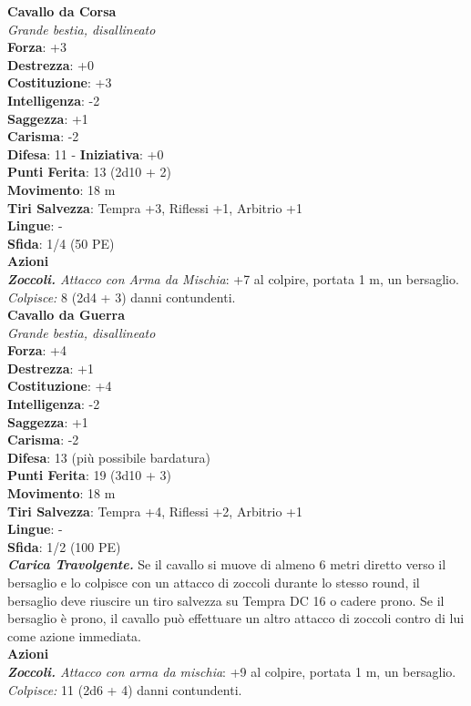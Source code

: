 \begin{multicols}{2}
\medskip\textbf{Cavallo da Corsa}\\
\emph{Grande bestia, disallineato}\\
\textbf{Forza}: +3\\
\textbf{Destrezza}: +0\\
\textbf{Costituzione}: +3\\
\textbf{Intelligenza}: -2\\
\textbf{Saggezza}: +1\\
\textbf{Carisma}: -2\\
\textbf{Difesa}: 11 - \textbf{Iniziativa}: +0\\
\textbf{Punti Ferita}: 13 (2d10 + 2)\\
\textbf{Movimento}: 18 m\\
\textbf{Tiri Salvezza}: Tempra +3, Riflessi +1, Arbitrio +1 \\
\textbf{Lingue}: -\\
\textbf{Sfida}: 1/4 (50 PE)\smallskip\\
\smallskip\textbf{Azioni}\\
\emph{\textbf{Zoccoli.} Attacco con Arma da Mischia}: +7 al colpire, portata 1 m, un bersaglio.\\
\emph{Colpisce:} 8 (2d4 + 3) danni contundenti.\\

\medskip\textbf{Cavallo da Guerra}\\
\emph{Grande bestia, disallineato}\\
\textbf{Forza}: +4\\
\textbf{Destrezza}: +1\\
\textbf{Costituzione}: +4\\
\textbf{Intelligenza}: -2\\
\textbf{Saggezza}: +1\\
\textbf{Carisma}: -2\\
\textbf{Difesa}: 13 (più possibile bardatura)\\
\textbf{Punti Ferita}: 19 (3d10 + 3)\\
\textbf{Movimento}: 18 m\\
\textbf{Tiri Salvezza}:  Tempra +4, Riflessi +2, Arbitrio +1 \\
\textbf{Lingue}: -\\
\textbf{Sfida}: 1/2 (100 PE)\smallskip\\
\emph{\textbf{Carica Travolgente.}} Se il cavallo si muove di almeno 6 metri diretto verso il bersaglio e lo colpisce con un attacco di zoccoli durante lo stesso round, il bersaglio deve riuscire un tiro salvezza su Tempra DC  16 o cadere prono. Se il bersaglio è prono, il cavallo può effettuare un altro attacco di zoccoli contro di lui come azione immediata. \\
\smallskip\textbf{Azioni}\\
\emph{\textbf{Zoccoli.} Attacco con arma da mischia}: +9 al colpire, portata 1 m, un bersaglio.\\
\emph{Colpisce:} 11 (2d6 + 4) danni contundenti.\\


\end{multicols}
